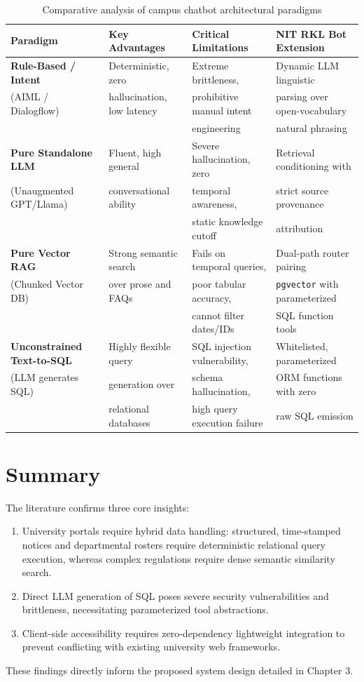 \documentclass[12pt,a4paper]{report}
\begin{document}
\begin{table}[htbp]
\centering
\small
\caption{Comparative analysis of campus chatbot architectural paradigms}
\label{tab:baseline_comparison}
\begin{tabularx}{\textwidth}{lXXX}
\toprule
\textbf{Paradigm} & \textbf{Key Advantages} & \textbf{Critical Limitations} & \textbf{NIT RKL Bot Extension} \\
\midrule
\textbf{Rule-Based / Intent} & Deterministic, zero & Extreme brittleness, & Dynamic LLM linguistic \\
(AIML / Dialogflow) & hallucination, low latency & prohibitive manual intent & parsing over open-vocabulary \\
\cite{colace2018evaluating} & & engineering & natural phrasing \\
\addlinespace
\textbf{Pure Standalone LLM} & Fluent, high general & Severe hallucination, zero & Retrieval conditioning with \\
(Unaugmented GPT/Llama) & conversational ability & temporal awareness, & strict source provenance \\
\cite{brown2020language} & & static knowledge cutoff & attribution \\
\addlinespace
\textbf{Pure Vector RAG} & Strong semantic search & Fails on temporal queries, & Dual-path router pairing \\
(Chunked Vector DB) & over prose and FAQs & poor tabular accuracy, & \texttt{pgvector} with parameterized \\
\cite{lewis2020retrieval} & & cannot filter dates/IDs & SQL function tools \\
\addlinespace
\textbf{Unconstrained Text-to-SQL} & Highly flexible query & SQL injection vulnerability, & Whitelisted, parameterized \\
(LLM generates SQL) & generation over & schema hallucination, & ORM functions with zero \\
\cite{zhong2017seq2sql} & relational databases & high query execution failure & raw SQL emission \\
\bottomrule
\end{tabularx}
\end{table}

\section{Summary}
The literature confirms three core insights:
\begin{enumerate}
    \item University portals require hybrid data handling: structured, time-stamped notices and departmental rosters require deterministic relational query execution, whereas complex regulations require dense semantic similarity search.
    \item Direct LLM generation of SQL poses severe security vulnerabilities and brittleness, necessitating parameterized tool abstractions.
    \item Client-side accessibility requires zero-dependency lightweight integration to prevent conflicting with existing university web frameworks.
\end{enumerate}
These findings directly inform the proposed system design detailed in Chapter 3.
\end{document}
